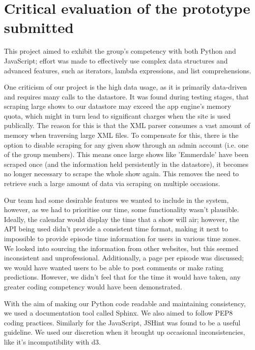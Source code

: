 \documentclass[12pt, a4paper]{article}
\begin{document}
\newpage	
\section{Critical evaluation of the prototype submitted}

This project aimed to exhibit the group's competency with both Python and JavaScript; effort was made to effectively use complex data structures and advanced features, such as iterators, lambda expressions, and list comprehensions.

One criticism of our project is the high data usage, as it is primarily data-driven and requires many calls to the datastore. It was found during testing stages, that scraping large shows to our datastore may exceed the app engine's memory quota, which might in turn lead to significant charges when the site is used publically. The reason for this is that the XML parser consumes a vast amount of memory when traversing large XML files. To compensate for this, there is the option to disable scraping for any given show through an admin account (i.e. one of the group members). This means once large shows like 'Emmerdale' have been scraped once (and the information held persistently in the datastore), it becomes no longer necessary to scrape the whole show again. This removes the need to retrieve such a large amount of data via scraping on multiple occasions.

Our team had some desirable features we wanted to include in the system, however, as we had to prioritise our time, some functionality wasn't plausible. Ideally, the calendar would display the time that a show will air; however, the API being used didn't provide a consistent time format, making it next to impossible to provide episode time information for users in various time zones. We looked into sourcing the information from other websites, but this seemed inconsistent and unprofessional. Additionally, a page per episode was discussed; we would have wanted users to be able to post comments or make rating predictions. However, we didn't feel that for the time it would have taken, any greater coding competency would have been demonstrated. 

With the aim of making our Python code readable and maintaining consistency, we used a documentation tool called Sphinx. We also aimed to follow PEP8 coding practices. Similarly for the JavaScript, JSHint was found to be a useful guideline. We used our discretion when it brought up occasional inconsistencies, like it's incompatibility with d3.
\end{document}
